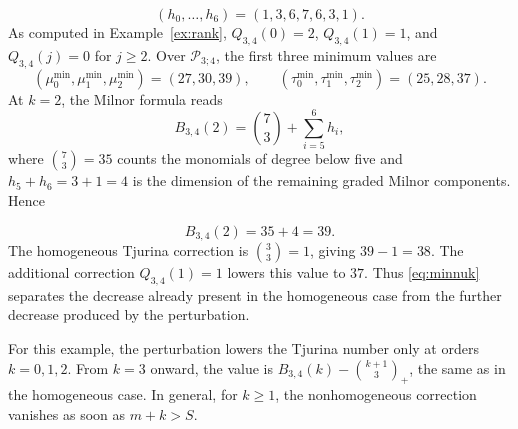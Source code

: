 \documentclass[12pt,reqno]{amsart}
\newcommand{\tbin}[2]{\binom{#1}{#2}_{\!+}}
\theoremstyle{definition}
\begin{document}
\[
 (h_0,\ldots,h_6)=(1,3,6,7,6,3,1).
\]
As computed in Example~\ref{ex:rank}, $Q_{3,4}(0)=2$,
$Q_{3,4}(1)=1$, and $Q_{3,4}(j)=0$ for $j\geq2$.
Over $\mathcal P_{3;4}$, the first three minimum values are
\[
 (\mu_0^{\min},\mu_1^{\min},\mu_2^{\min})=(27,30,39),\qquad
 (\tau_0^{\min},\tau_1^{\min},\tau_2^{\min})=(25,28,37).
\]
At $k=2$, the Milnor formula reads
\[
 B_{3,4}(2)=\binom{7}{3}+\sum_{i=5}^{6}h_i,
\]
where $\binom{7}{3}=35$ counts the monomials of degree below five
and $h_5+h_6=3+1=4$ is the dimension of the remaining graded
Milnor components. Hence

\[
 B_{3,4}(2)=35+4=39.
\]
The homogeneous Tjurina correction is $\binom{3}{3}=1$, giving
$39-1=38$. The additional correction $Q_{3,4}(1)=1$ lowers this value to
$37$. Thus \eqref{eq:minnuk} separates the decrease already present
in the homogeneous case from the further decrease produced by the
perturbation.

 
For this example, the perturbation lowers the Tjurina number only at
orders $k=0,1,2$. From $k=3$ onward, the value is
$B_{3,4}(k)-\tbin{k+1}{3}$, the same as in the homogeneous case.
In general, for $k\geq1$, the nonhomogeneous correction vanishes as
soon as $m+k>S$. 



\end{document}
